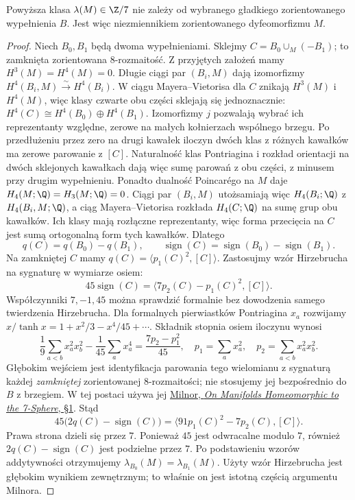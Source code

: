 \begin{twierdzenie}
\label{thm:milnor-invariant-25}
Powyższa klasa $\lambda(M)\in\Z/7$
nie zależy od wybranego gładkiego
zorientowanego wypełnienia $B$.
Jest więc niezmiennikiem
zorientowanego dyfeomorfizmu $M$.
\end{twierdzenie}
\begin{proof}
Niech $B_0,B_1$ będą dwoma
wypełnieniami. Sklejmy
$C=B_0\cup_M(-B_1)$;
to zamknięta zorientowana
$8$-rozmaitość. Z przyjętych założeń
mamy $H^3(M)=H^4(M)=0$.
Długie ciągi par $(B_i,M)$ dają
izomorfizmy
$H^4(B_i,M)\xrightarrow{\sim}H^4(B_i)$.
W ciągu Mayera--Vietorisa dla $C$
znikają $H^3(M)$ i $H^4(M)$,
więc klasy czwarte obu części
sklejają się jednoznacznie:
$H^4(C)\cong H^4(B_0)\oplus H^4(B_1)$.
Izomorfizmy $j$ pozwalają wybrać
ich reprezentanty względne, zerowe
na małych kołnierzach wspólnego brzegu.
Po przedłużeniu przez zero na drugi
kawałek iloczyn dwóch klas z różnych
kawałków ma zerowe parowanie z $[C]$.
Naturalność klas Pontriagina i rozkład
orientacji na dwóch sklejonych
kawałkach dają więc
sumę parowań z obu części, z minusem
przy drugim wypełnieniu. Ponadto
dualność Poincarégo na $M$ daje
$H_4(M;\Q)=H_3(M;\Q)=0$.
Ciągi par $(B_i,M)$ utożsamiają więc
$H_4(B_i;\Q)$ z $H_4(B_i,M;\Q)$,
a ciąg Mayera--Vietorisa rozkłada
$H_4(C;\Q)$ na sumę grup obu kawałków.
Ich klasy mają rozłączne reprezentanty,
więc forma przecięcia na $C$ jest
sumą ortogonalną form tych kawałków.
Dlatego
\[
 q(C)=q(B_0)-q(B_1),\qquad
 \operatorname{sign}(C)
  =\operatorname{sign}(B_0)
   -\operatorname{sign}(B_1).
\]
Na zamkniętej $C$ mamy
$q(C)=\langle p_1(C)^2,[C]\rangle$.
Zastosujmy wzór Hirzebrucha
na sygnaturę w wymiarze osiem:
\[
 45\operatorname{sign}(C)=
 \langle 7p_2(C)-p_1(C)^2,[C]\rangle.
\]
Współczynniki $7,-1,45$ można sprawdzić
formalnie bez dowodzenia samego twierdzenia
Hirzebrucha. Dla formalnych pierwiastków
Pontriagina $x_a$ rozwijamy
$x/\tanh x=1+x^2/3-x^4/45+\cdots$.
Składnik stopnia osiem iloczynu wynosi
\[
 \frac1{9}\sum_{a<b}x_a^2x_b^2
 -\frac1{45}\sum_a x_a^4
 =\frac{7p_2-p_1^2}{45},
 \quad p_1=\sum_a x_a^2,\quad
 p_2=\sum_{a<b}x_a^2x_b^2.
\]
Głębokim wejściem jest identyfikacja
parowania tego wielomianu z sygnaturą
każdej \emph{zamkniętej} zorientowanej
$8$-rozmaitości; nie stosujemy jej
bezpośrednio do $B$ z brzegiem. W tej
postaci używa jej
\href{https://sites.math.rutgers.edu/~feehan/teaching/math866/milnor7sphere.pdf}
{Milnor, \emph{On Manifolds Homeomorphic
to the 7-Sphere}, §1}.
Stąd
\[
 45\bigl(2q(C)-\operatorname{sign}(C)\bigr)
 =
 \langle 91p_1(C)^2-7p_2(C),[C]\rangle.
\]
Prawa strona dzieli się przez $7$.
Ponieważ $45$ jest odwracalne
modulo $7$, również
$2q(C)-\operatorname{sign}(C)$
jest podzielne przez $7$.
Po podstawieniu wzorów
addytywności otrzymujemy
$\lambda_{B_0}(M)=\lambda_{B_1}(M)$.
Użyty wzór Hirzebrucha jest
głębokim wynikiem zewnętrznym;
to właśnie on jest istotną
częścią argumentu Milnora.
\end{proof}


